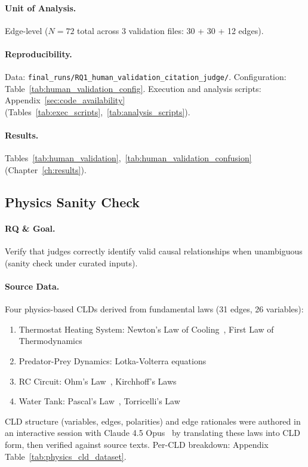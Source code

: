 \paragraph{Unit of Analysis.}
Edge-level ($N=72$ total across 3 validation files: 30 + 30 + 12 edges).

\paragraph{Reproducibility.}
Data: \texttt{final\_runs/RQ1\_human\_validation\_citation\_judge/}. Configuration: Table~\ref{tab:human_validation_config}. Execution and analysis scripts: Appendix~\ref{sec:code_availability} (Tables~\ref{tab:exec_scripts},~\ref{tab:analysis_scripts}).

\paragraph{Results.}
Tables~\ref{tab:human_validation},~\ref{tab:human_validation_confusion} (Chapter~\ref{ch:results}).

\subsection{Physics Sanity Check}
\label{sec:physics_validation}

\paragraph{RQ \& Goal.}
Verify that judges correctly identify valid causal relationships when unambiguous (sanity check under curated inputs).

\paragraph{Source Data.}
Four physics-based CLDs derived from fundamental laws (31 edges, 26 variables):
\begin{enumerate}[noitemsep]
    \item Thermostat Heating System: Newton's Law of Cooling~\cite{newton1701scala}, First Law of Thermodynamics~\cite{clausius1850heat}
    \item Predator-Prey Dynamics: Lotka-Volterra equations~\cite{lotka1925elements,volterra1928fluctuations}
    \item RC Circuit: Ohm's Law~\cite{ohm1827galvanische}, Kirchhoff's Laws~\cite{kirchhoff1845durchgang}
    \item Water Tank: Pascal's Law~\cite{pascal1663equilibre}, Torricelli's Law~\cite{torricelli1644opera}
\end{enumerate}
CLD structure (variables, edges, polarities) and edge rationales were authored in an interactive session with Claude 4.5 Opus~\cite{anthropic2025claude45opus} by translating these laws into CLD form, then verified against source texts. Per-CLD breakdown: Appendix Table~\ref{tab:physics_cld_dataset}.

